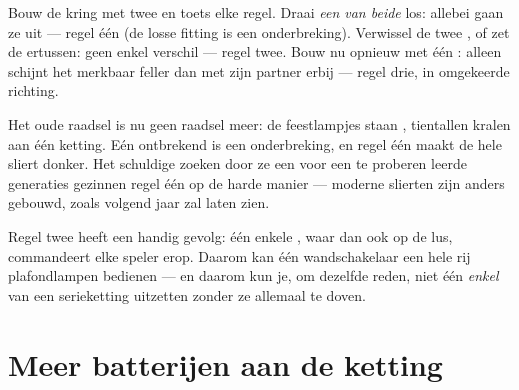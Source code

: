 \begin{example}\label{ex:g4:series-circuits:seeing}
Bouw de kring met twee  en toets elke regel. Draai \emph{een
van beide}  los: allebei gaan ze uit --- regel één (de losse
fitting is een onderbreking). Verwissel de twee , of zet de
 ertussen: geen enkel verschil --- regel twee. Bouw nu
opnieuw met één : alleen schijnt het merkbaar feller dan met zijn
partner erbij --- regel drie, in omgekeerde richting.
\end{example}

\begin{example}\label{ex:g4:series-circuits:partylights}
Het oude raadsel is nu geen raadsel meer: de feestlampjes staan
, tientallen kralen aan één ketting. Eén ontbrekend
 is een onderbreking, en regel één maakt de hele sliert donker.
Het schuldige  zoeken door ze een voor een te proberen leerde
generaties gezinnen regel één op de harde manier --- moderne slierten
zijn anders gebouwd, zoals volgend jaar zal laten zien.
\end{example}

\begin{remark}\label{rem:g4:series-circuits:switch}
Regel twee heeft een handig gevolg: één enkele , waar dan
ook op de lus, commandeert elke speler erop. Daarom kan één
wandschakelaar een hele rij plafondlampen bedienen --- en daarom kun
je, om dezelfde reden, niet één \emph{enkel}  van een
serieketting uitzetten zonder ze allemaal te doven.
\end{remark}

\section{Meer batterijen aan de ketting}


